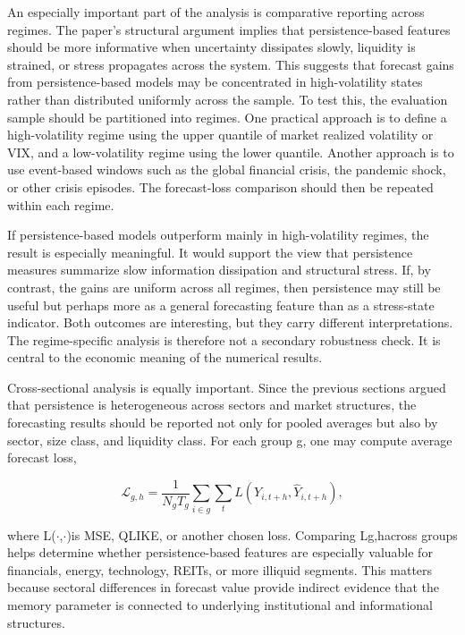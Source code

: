 \documentclass[12pt]{article}
\begin{document}
An especially important part of the analysis is comparative reporting across regimes. The paper's structural argument implies that persistence-based features should be more informative when uncertainty dissipates slowly, liquidity is strained, or stress propagates across the system. This suggests that forecast gains from persistence-based models may be concentrated in high-volatility states rather than distributed uniformly across the sample. To test this, the evaluation sample should be partitioned into regimes. One practical approach is to define a high-volatility regime using the upper quantile of market realized volatility or VIX, and a low-volatility regime using the lower quantile. Another approach is to use event-based windows such as the global financial crisis, the pandemic shock, or other crisis episodes. The forecast-loss comparison should then be repeated within each regime.

If persistence-based models outperform mainly in high-volatility regimes, the result is especially meaningful. It would support the view that persistence measures summarize slow information dissipation and structural stress. If, by contrast, the gains are uniform across all regimes, then persistence may still be useful but perhaps more as a general forecasting feature than as a stress-state indicator. Both outcomes are interesting, but they carry different interpretations. The regime-specific analysis is therefore not a secondary robustness check. It is central to the economic meaning of the numerical results.

Cross-sectional analysis is equally important. Since the previous sections argued that persistence is heterogeneous across sectors and market structures, the forecasting results should be reported not only for pooled averages but also by sector, size class, and liquidity class. For each group g, one may compute average forecast loss,

\[\mathcal{L}_{g,h} = \frac{1}{N_g T_g}\sum_{i \in g}\sum_t L(Y_{i,t+h}, \hat{Y}_{i,t+h}),\]

where L($\cdot$,$\cdot$)is MSE, QLIKE, or another chosen loss. Comparing Lg,hacross groups helps determine whether persistence-based features are especially valuable for financials, energy, technology, REITs, or more illiquid segments. This matters because sectoral differences in forecast value provide indirect evidence that the memory parameter is connected to underlying institutional and informational structures.
\end{document}
